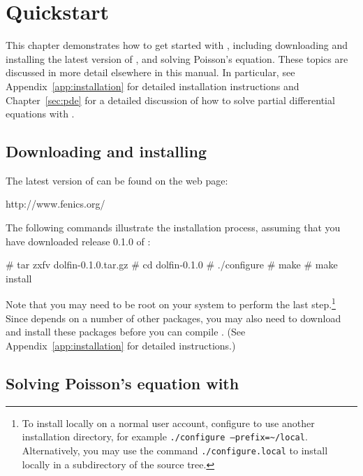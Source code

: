 \chapter{Quickstart}
\label{chap:quickstart}

This chapter demonstrates how to get started with \dolfin{}, including
downloading and installing the latest version of \dolfin{}, and solving
Poisson's equation. These topics are discussed in more detail
elsewhere in this manual. In particular, see
Appendix~\ref{app:installation} for detailed installation instructions
and Chapter~\ref{sec:pde} for a detailed discussion of how to solve
partial differential equations with \dolfin{}.

\section{Downloading and installing \dolfin{}}

The latest version of \dolfin{} can be found on the \fenics{} web page:
\begin{code}
  http://www.fenics.org/
\end{code}
The following commands illustrate the installation process, assuming
that you have downloaded release 0.1.0 of \dolfin{}:
\begin{code}
  # tar zxfv dolfin-0.1.0.tar.gz
  # cd dolfin-0.1.0
  # ./configure
  # make
  # make install
\end{code}

Note that you may need to be root on your system to perform the last
step.\footnote{To install \dolfin{} locally on a normal user account,
configure \dolfin{} to use another installation directory, for example
\texttt{./configure --prefix=\~{}/local}. Alternatively, you may use the
command \texttt{./configure.local} to install \dolfin{} locally in a
subdirectory of the source tree.}  Since \dolfin{} depends on a number
of other packages, you may also need to download and install these
packages before you can compile \dolfin{}.  (See
Appendix~\ref{app:installation} for detailed instructions.)

\section{Solving Poisson's equation with \dolfin{}}

